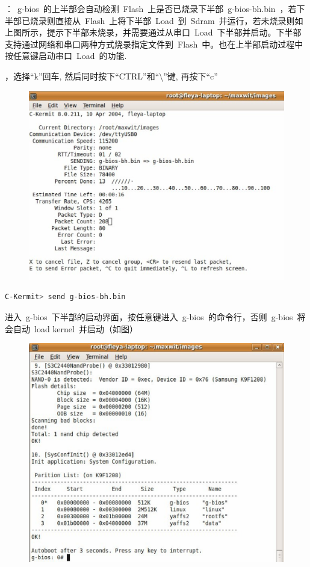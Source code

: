 \documentclass[a4paper,11pt]{book}
\begin{document}
\begin{CJK*}{UTF8}{gbsn}
：~g-bios~的上半部会自动检测~Flash~上是否已烧录下半部~g-bios-bh.bin~，若下半部已烧录则直接从~Flash~上将下半部~Load~到~Sdram~并运行，若未烧录则如上图所示，提示下半部未烧录，并需要通过从串口~Load~下半部并启动。下半部支持通过网络和串口两种方式烧录指定文件到~Flash~中。也在上半部启动过程中按任意键启动串口~Load~的功能.

，选择``k''回车, 然后同时按下``CTRL''和``\textbackslash''键, 再按下``c''\\

\begin{figure}[H]
\centering
\includegraphics[width=5in]{image/step3.eps}
\end{figure}

\begin{lstlisting}[language=bash,numbers=none]
C-Kermit> send g-bios-bh.bin
\end{lstlisting}
进入~g-bios~下半部的启动界面，按任意键进入~g-bios~的命令行，否则~g-bios~将会自动~load kernel~并启动（如图）

\begin{figure}[H]
\centering
\includegraphics[width=5in]{image/step4.eps}
\end{figure}


\end{CJK*}
\end{document}
